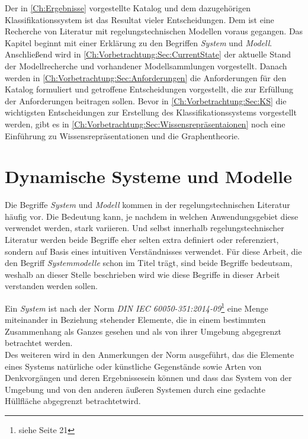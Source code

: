 Der in \ref{Ch:Ergebnisse} vorgestellte Katalog und dem dazugehörigen Klassifikationssystem ist das Resultat vieler Entscheidungen. Dem ist eine Recherche von Literatur mit regelungstechnischen Modellen voraus gegangen. Das Kapitel beginnt mit einer Erklärung zu den Begriffen \textit{System} und \textit{Modell}. Anschließend wird in \ref{Ch:Vorbetrachtung:Sec:CurrentState} der aktuelle Stand der Modellrecherche und vorhandener Modellsammlungen vorgestellt. Danach werden in \ref{Ch:Vorbetrachtung:Sec:Anforderungen} die Anforderungen für den Katalog formuliert und getroffene Entscheidungen vorgestellt, die zur Erfüllung der Anforderungen beitragen sollen. Bevor in \ref{Ch:Vorbetrachtung:Sec:KS} die wichtigsten Entscheidungen zur Erstellung des Klassifikationssystems vorgestellt werden, gibt es in \ref{Ch:Vorbetrachtung:Sec:Wissensrepräsentaionen} noch eine Einführung zu Wissensrepräsentationen und die Graphentheorie.   

\section{Dynamische Systeme und Modelle}
\label{Ch:Vorbetrachtung:Sec:SystemeModelle}
Die Begriffe \textit{System} und \textit{Modell} kommen in der regelungstechnischen Literatur häufig vor. Die Bedeutung kann, je nachdem in welchen Anwendungsgebiet diese verwendet werden, stark variieren. Und selbst innerhalb regelungstechnischer Literatur werden beide Begriffe eher selten extra definiert oder referenziert, sondern auf Basis eines intuitiven Verständnisses verwendet. Für diese Arbeit, die den Begriff \textit{Systemmodelle} schon im Titel trägt, sind beide Begriffe bedeutsam, weshalb an dieser Stelle beschrieben wird wie diese Begriffe in dieser Arbeit verstanden werden sollen.

Ein \textit{System} ist nach der Norm \textit{DIN IEC 60050-351:2014-09}\footnote{siehe \cite{DINIEC60050-351} Seite 21} eine \glqq Menge miteinander in Beziehung stehender Elemente, die in einem bestimmten Zusammenhang als Ganzes gesehen und als von ihrer Umgebung abgegrenzt betrachtet werden\grqq.\\
Des weiteren wird in den Anmerkungen der Norm ausgeführt, das die Elemente eines Systems \glqq natürliche oder künstliche Gegenstände sowie Arten von Denkvorgängen und deren Ergebnisse\grqq sein können und dass das System \glqq von der Umgebung und von den anderen äußeren Systemen durch eine gedachte Hüllfläche abgegrenzt betrachtet\grqq wird.

